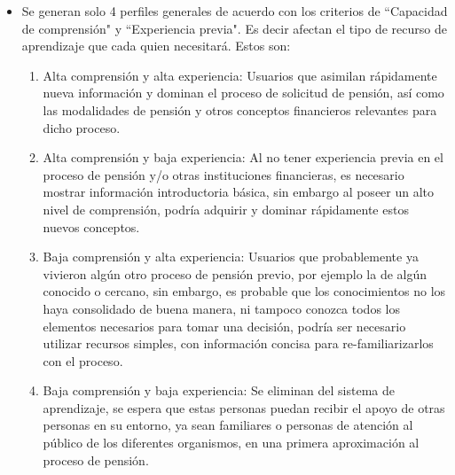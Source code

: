 \begin{itemize}
       \item Se generan solo 4 perfiles generales de acuerdo con los criterios de ``Capacidad de comprensión" y ``Experiencia previa". Es decir afectan el tipo de recurso de aprendizaje que cada quien necesitará. Estos son:  
    \begin{enumerate}
        \item Alta comprensión y alta experiencia: Usuarios que asimilan rápidamente nueva información y dominan el proceso de solicitud de pensión, así como las modalidades de pensión y otros conceptos financieros relevantes para dicho proceso.
        \item Alta comprensión y baja experiencia: Al no tener experiencia previa en el proceso de pensión y/o otras instituciones financieras, es necesario mostrar información introductoria básica, sin embargo al poseer un alto nivel de comprensión, podría adquirir y dominar rápidamente estos nuevos conceptos.
        \item Baja comprensión y alta experiencia:  Usuarios que probablemente ya vivieron algún otro proceso de pensión previo, por ejemplo la de algún conocido o cercano, sin embargo, es probable que los conocimientos no los haya consolidado de buena manera, ni tampoco conozca todos los elementos necesarios para tomar una decisión, podría ser necesario utilizar recursos simples, con información concisa para re-familiarizarlos con el proceso.
        \item Baja comprensión y baja experiencia: Se eliminan del sistema de aprendizaje, se espera que estas personas puedan recibir el apoyo de otras personas en su entorno, ya sean familiares o personas de atención al público de los diferentes organismos, en una primera aproximación al proceso de pensión. 
    \end{enumerate}


\end{itemize}
